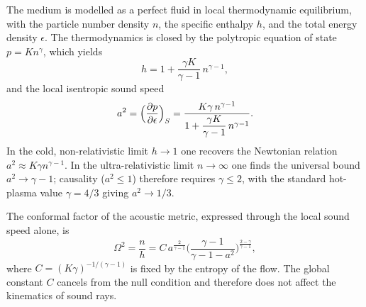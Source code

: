 \documentclass[12pt,a4paper,preprint]{elsarticle}
\begin{document}
            The medium is modelled as a perfect fluid in local thermodynamic equilibrium, with the particle number density $n$, the specific enthalpy $h$, and the total energy density $\epsilon$. The thermodynamics is closed by the polytropic equation of state $p = K n^{\gamma}$, which yields
            \begin{equation}
                h = 1 + \frac{\gamma K}{\gamma-1}\, n^{\gamma-1} ,
                \label{eq:enthalpy-polytropic}
            \end{equation}
            and the local isentropic sound speed
            \begin{equation}
                a^{2} = \Bigl(\frac{\partial p}{\partial\epsilon}\Bigr)_{S} = \frac{K\gamma\, n^{\gamma-1}}{1 + \dfrac{\gamma K}{\gamma-1}\, n^{\gamma-1}} .
                \label{eq:sound-speed-polytropic}
            \end{equation}
            In the cold, non-relativistic limit $h\to 1$ one recovers the Newtonian relation $a^{2}\approx K\gamma n^{\gamma-1}$. In the ultra-relativistic limit $n\to\infty$ one finds the universal bound $a^{2}\to\gamma-1$; causality ($a^{2}\le 1$) therefore requires $\gamma\le 2$, with the standard hot-plasma value $\gamma=4/3$ giving $a^{2}\to 1/3$.

            The conformal factor of the acoustic metric, expressed through the local sound speed alone, is
            \begin{equation}
                \Omega^{2} = \frac{n}{h} = C\, a^{\frac{2}{\gamma-1}} \Biggl( \frac{\gamma-1}{\gamma-1-a^{2}} \Biggr)^{\frac{2-\gamma}{\gamma-1}} ,
                \label{eq:conformal-factor}
            \end{equation}
            where $C=(K\gamma)^{-1/(\gamma-1)}$ is fixed by the entropy of the flow. The global constant $C$ cancels from the null condition and therefore does not affect the kinematics of sound rays.
\end{document}
